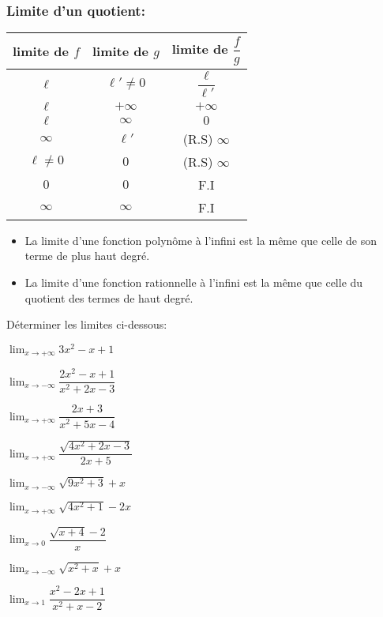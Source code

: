 \documentclass[12pt,a4paper,x11names,usenames,dvipsnames,svgnames,oneside]{book}
\begin{document}
\subsubsection{Limite d'un quotient:}
\begin{center}
\begin{tabular}{|c|c|c|}
\hline
limite de $f$ & limite de $g$ & limite de $\dfrac{f}{g}$\\
\hline 
$\ell$ & $\ell '\neq 0$ & $\dfrac{\ell}{\ell'}$\\
\hline
$\ell$ & $+\infty$ & $+\infty$\\
\hline
$\ell$ & $\infty$ & $0$\\
\hline
$\infty$ & $\ell'$ & (R.S) $\infty$\\
\hline
$\ell \neq 0$ & $0 $ & (R.S) $\infty$\\
\hline
$0$ & $0$ & F.I\\
\hline
$\infty$ & $\infty$ & F.I\\
\hline
\end{tabular}
\end{center}
\begin{thr}
\begin{itemize}
\item La limite d'une fonction polynôme à l'infini est la même que celle de son terme de plus haut degré.
\item La limite d'une fonction rationnelle à l'infini est la même que celle du quotient des termes de haut degré.
\end{itemize}
\end{thr}
\begin{act}
Déterminer les limites ci-dessous:
\begin{enumerate}
\begin{multicols}{3}
\item $\lim_{x\to+\infty}3x^2-x+1$
\item $\lim_{x\to-\infty}\dfrac{2x^2-x+1}{x^2+2x-3}$
\item $\lim_{x\to+\infty}\dfrac{2x+3}{x^2+5x-4}$

\item $\lim_{x\to+\infty}\dfrac{\sqrt{4x^2+2x-3}}{2x+5}$
\item $\lim_{x\to-\infty}\sqrt{9x^2+3}+x$
\item $\lim_{x\to+\infty}\sqrt{4x^2+1}-2x$

\item $\lim_{x\to 0}\dfrac{\sqrt{x+4}-2}{x}$
\item $\lim_{x\to-\infty}\sqrt{x^2+x}+x$
\item $\lim_{x\to 1}\dfrac{x^2-2x+1}{x^2+x-2}$
\end{multicols}
\end{enumerate}
\end{act}
\end{document}
